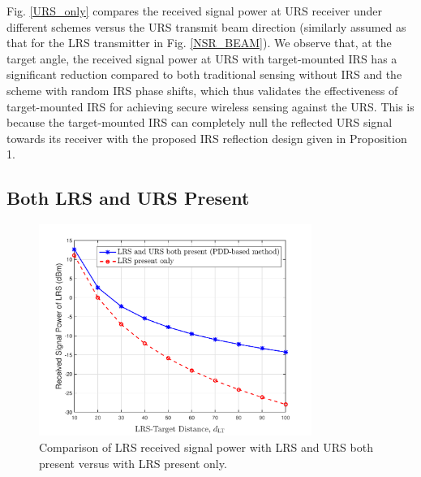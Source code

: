 \documentclass[10pt,final,doublecolumn]{IEEEtran}
\begin{document}
Fig. \ref{URS_only} compares the received signal power at URS receiver under different schemes versus the URS transmit beam direction (similarly assumed as that for the LRS transmitter in Fig. \ref{NSR_BEAM}). We observe that, at the target angle, the received signal power at URS with
target-mounted IRS has a significant reduction compared to both traditional sensing without IRS and the scheme with random IRS phase shifts, which thus validates the effectiveness of target-mounted IRS for achieving secure wireless sensing against the URS. This is because the
target-mounted IRS can completely null the reflected URS signal towards its receiver with the proposed IRS reflection design given in Proposition 1.

\subsection{Both LRS and URS Present}
\begin{figure}[t]
\centering
\setlength{\abovecaptionskip}{0.cm}
\includegraphics[width=3.5in]{pro_LRSO.pdf}
\caption{Comparison of LRS received signal power with LRS and URS both present versus with LRS present only.}
\label{pro_LRSO}
\end{figure}
\end{document}
